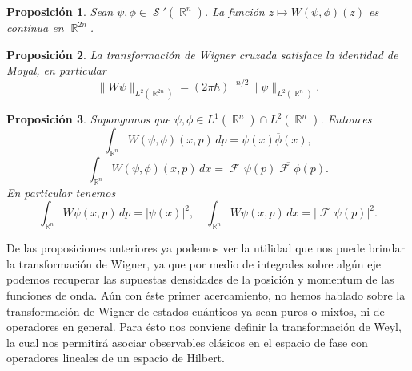 \documentclass[a4paper]{report}
\DeclareMathOperator{\R}{\mathbb{R}}
\DeclareMathOperator{\Sz}{\mathcal S}
\DeclareMathOperator{\F}{\mathcal{F}\!}
\newtheorem{proposition}{Proposición}
\begin{document}
  \begin{proposition}
    Sean $\psi,\phi \in \Sz'(\R^{n})$. La función $z
    \mapsto W(\psi,\phi)(z)$ es continua en $\R^{2n}$.
  \end{proposition}

  \begin{proposition}
    La transformación de Wigner cruzada satisface la
    identidad de Moyal, en particular
    \begin{equation}
      \|W\psi\|_{L^2(\R^{2n})}
      = (2\pi\hbar)^{-n / 2} \|\psi\|_{L^2(\R^{n})}.
    \end{equation}
  \end{proposition}

  \begin{proposition}
    Supongamos que $\psi, \phi \in L^{1}(\R^{n}) \cap
    L^2(\R^{n})$. Entonces
    \begin{equation}
      \int_{\R^{n}} W(\psi,\phi)(x,p) \, dp
      = \psi(x)\overline{\phi}(x),
    \end{equation}
    \begin{equation}
      \int_{\R^{n}} W(\psi,\phi)(x,p) \, dx
      = \F\psi(p) \overline{\F\phi}(p).
    \end{equation}
    En particular tenemos
    \begin{equation}
      \int_{\R^{n}} W\psi(x,p) \, dp
      = |\psi(x)|^2,
      \quad
      \int_{\R^{n}} W\psi(x,p) \, dx
      = |\F\psi(p)|^2.
    \end{equation}
  \end{proposition}

  De las proposiciones anteriores ya podemos ver la utilidad
  que nos puede brindar la transformación de Wigner, ya que
  por medio de integrales sobre algún eje podemos recuperar
  las supuestas densidades de la posición y momentum de las
  funciones de onda. Aún con éste primer acercamiento, no
  hemos hablado sobre la transformación de Wigner de estados
  cuánticos ya sean puros o mixtos, ni de operadores en
  general. Para ésto nos conviene definir la transformación
  de Weyl, la cual nos permitirá asociar observables
  clásicos en el espacio de fase con operadores lineales de
  un espacio de Hilbert.
\end{document}
